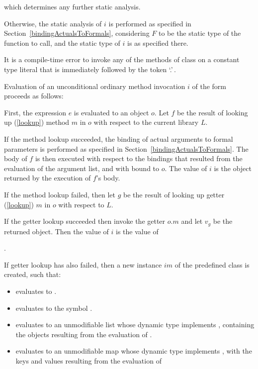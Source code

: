 \documentclass[makeidx]{article}
\begin{document}
{\noindent
which determines any further static analysis.

\LMHash{}%
Otherwise, the static analysis of $i$ is performed
as specified in Section~\ref{bindingActualsToFormals},
considering $F$ to be the static type of the function to call,
and the static type of $i$ is as specified there.

\LMHash{}%
It is a compile-time error to invoke any of the methods of class 
on a constant type literal that is immediately followed by the token `.'\,.


\LMHash{}%
Evaluation of an unconditional ordinary method invocation $i$ of the form
proceeds as follows:

\LMHash{}%
First, the expression $e$ is evaluated to an object $o$.
Let $f$ be the result of looking up
(\ref{lookup})
method $m$ in $o$ with respect to the current library $L$.

\LMHash{}%
If the method lookup succeeded,
the binding of actual arguments to formal parameters is performed
as specified in Section~\ref{bindingActualsToFormals}.
The body of $f$ is then executed with respect to the bindings
that resulted from the evaluation of the argument list,
and with \THIS{} bound to $o$.
The value of $i$ is the object returned by the execution of $f$'s body.

\LMHash{}%
If the method lookup failed,
then let $g$ be the result of looking up getter
(\ref{lookup})
$m$ in $o$ with respect to $L$.

\LMHash{}%
If the getter lookup succeeded then invoke the getter $o.m$
and let $v_g$ be the returned object.
Then the value of $i$ is the value of

.

\LMHash{}%
If getter lookup has also failed,
then a new instance $im$ of the predefined class  is created,
such that:
\begin{itemize}
\item {} evaluates to \TRUE.
\item {} evaluates to the symbol .
\item {} evaluates to an unmodifiable list
  whose dynamic type implements ,
  containing the objects resulting from the evaluation of
  .
\item {} evaluates to an unmodifiable map
  whose dynamic type implements ,
  with the keys and values resulting from the evaluation of


\end{itemize}}
\end{document}

